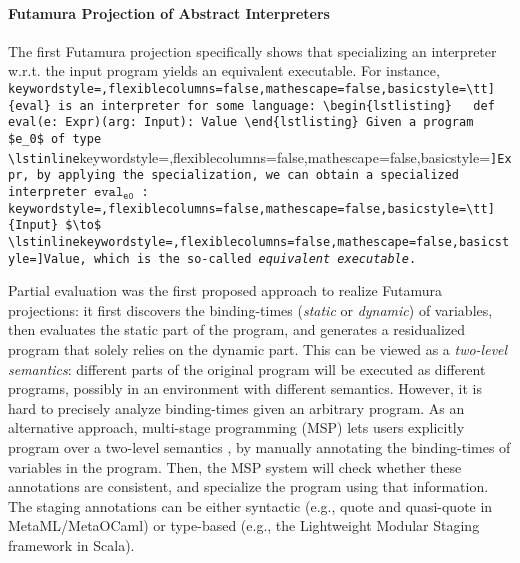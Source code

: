 
\paragraph{Futamura Projection of Abstract Interpreters}

The first Futamura projection specifically shows that specializing an
interpreter w.r.t. the input program yields an equivalent
executable. For instance,
\lstinline[keywordstyle=,flexiblecolumns=false,mathescape=false,basicstyle=\tt]{eval}
is an interpreter for some language:
\begin{lstlisting}
  def eval(e: Expr)(arg: Input): Value
\end{lstlisting}
Given a program $e_0$ of type
\lstinline[keywordstyle=,flexiblecolumns=false,mathescape=false,basicstyle=\tt]{Expr},
by applying the specialization, we can obtain a specialized
interpreter $\texttt{eval}_{\texttt{e0}}$ :
\lstinline[keywordstyle=,flexiblecolumns=false,mathescape=false,basicstyle=\tt]{Input}
$\to$
\lstinline[keywordstyle=,flexiblecolumns=false,mathescape=false,basicstyle=\tt]{Value},
which is the so-called \textit{equivalent executable}.


Partial evaluation \cite{DBLP:books/daglib/0072559} was the first proposed
approach to realize Futamura projections: it first discovers the binding-times
(\textit{static} or \textit{dynamic}) of variables, then evaluates the static
part of the program, and generates a residualized program that solely relies on
the dynamic part. This can be viewed as a \textit{two-level semantics}:
different parts of the original program will be executed as different programs,
possibly in an environment with different semantics.
However, it is hard to precisely analyze binding-times given an arbitrary
program. As an alternative approach, multi-stage programming (MSP)
\cite{taha1999multi, DBLP:conf/pepm/TahaS97} lets users explicitly program over
a two-level semantics \cite{NIELSON198859}, by manually annotating the
binding-times of variables in the program. Then, the MSP system will check
whether these annotations are consistent, and specialize the program using that
information. The staging annotations can be either syntactic (e.g., quote and
quasi-quote in MetaML/MetaOCaml) or type-based (e.g., the Lightweight Modular
Staging framework \cite{DBLP:conf/gpce/RompfO10} in Scala).

